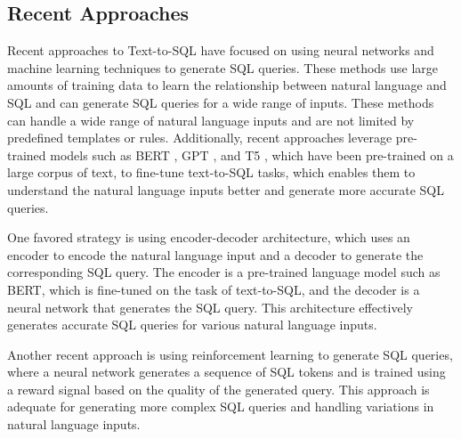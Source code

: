 \subsection{Recent Approaches}

Recent approaches to Text-to-SQL have focused on using neural networks and machine learning techniques to generate SQL queries. These methods use large amounts of training data to learn the relationship between natural language and SQL and can generate SQL queries for a wide range of inputs. These methods can handle a wide range of natural language inputs and are not limited by predefined templates or rules. Additionally, recent approaches leverage pre-trained models such as \ac{BERT} \cite{devlin-etal-2019-bert}, GPT \cite{radford2019language}, and T5 \cite{raffel_exploring_2020}, which have been pre-trained on a large corpus of text, to fine-tune text-to-SQL tasks, which enables them to understand the natural language inputs better and generate more accurate SQL queries.

One favored strategy is using encoder-decoder architecture, which uses an encoder to encode the natural language input and a decoder to generate the corresponding SQL query. The encoder is a pre-trained language model such as BERT, which is fine-tuned on the task of text-to-SQL, and the decoder is a neural network that generates the SQL query. This architecture effectively generates accurate SQL queries for various natural language inputs.

Another recent approach is using reinforcement learning to generate SQL queries, where a neural network generates a sequence of SQL tokens and is trained using a reward signal based on the quality of the generated query. This approach is adequate for generating more complex SQL queries and handling variations in natural language inputs.




